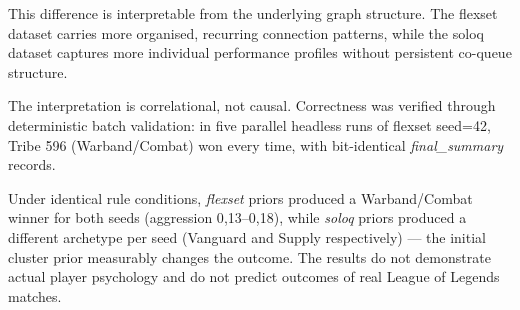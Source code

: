 This difference is interpretable from the underlying graph structure. The flexset dataset carries more organised, recurring connection patterns, while the soloq dataset captures more individual performance profiles without persistent co-queue structure.

The interpretation is correlational, not causal. Correctness was verified through deterministic batch validation: in five parallel headless runs of flexset seed=42, Tribe 596 (Warband/Combat) won every time, with bit-identical \textit{final\_summary} records.

Under identical rule conditions, \textit{flexset} priors produced a Warband/Combat winner for both seeds (aggression 0{,}13--0{,}18), while \textit{soloq} priors produced a different archetype per seed (Vanguard and Supply respectively) --- the initial cluster prior measurably changes the outcome. The results do not demonstrate actual player psychology and do not predict outcomes of real League of Legends matches.
